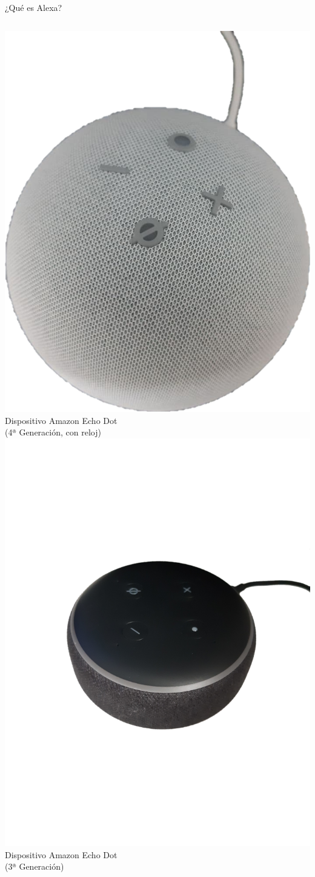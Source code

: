 \documentclass{beamer}
\begin{document}
\begin{frame}{¿Qué es Alexa?}
\begin{columns}[c]
\begin{column}{.49\textwidth}
{          \includegraphics[width=.46\textwidth]{echo-dot-2.png}
          \centering
          {
          \footnotesize
          Dispositivo Amazon Echo Dot\\
          (4ª Generación, con reloj)
          }
        }
        {
          \includegraphics[width=\textwidth,trim={0 9cm 0 8cm},clip]
          {echo-dot-3-gen.png}
          \centering
          {
          \footnotesize
          Dispositivo Amazon Echo Dot\\
          (3ª Generación)
          }
        }
        
      \end{column}
    \end{columns}
  \end{frame}
\end{document}
